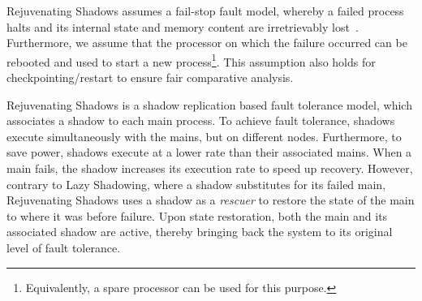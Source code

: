 

Rejuvenating Shadows assumes a fail-stop fault model, whereby a failed process halts and its internal state and memory content are irretrievably 
lost~\cite{Schlichting1983}. Furthermore, we assume that the processor on which the failure occurred can be rebooted and used to start a new process\footnote{Equivalently, a spare processor can be used for this purpose.}. This assumption also holds for checkpointing/restart to ensure fair comparative analysis. 
 

Rejuvenating Shadows is a shadow replication based fault tolerance model, which associates a shadow to each main process. To achieve fault tolerance, shadows execute simultaneously with the mains, but on different nodes. Furthermore, to save power, shadows execute at a lower rate than their associated mains.  When a main fails, the shadow increases its execution rate to speed up recovery. However, contrary to Lazy Shadowing, where a shadow substitutes for its failed main, Rejuvenating Shadows uses a shadow as a \textit{rescuer} to restore the state of the main to where it was before failure. Upon state restoration, both the main and its associated shadow are active, thereby bringing back the system to its original level of fault tolerance.

